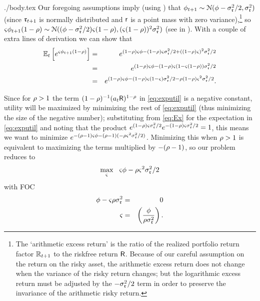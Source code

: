 \documentclass{bejournal}
\begin{document}
\begin{verbatimwrite}{./body.tex}
Our foregoing assumptions imply (using ) that $\phi_{t+1} \sim \mathcal{N}(\phi-\sigma_{\mathfrak{r}}^{2}/2,\sigma_{\mathfrak{r}}^{2})$ (since $\mathfrak{r}_{t+1}$ is normally distributed and $\mathsf{r}$ is a
point mass with zero variance),\footnote{The `arithmetic excess return' is the ratio of the realized portfolio return factor $\mathbb{R}_{t+1}$ to the riskfree return $\mathsf{R}$.  Because of our careful assumption on the return on the risky asset, the arithmetic excess return does not change when the variance of the risky return changes; but the logarithmic excess return must be adjusted by the $-\sigma^{2}_{\mathfrak{r}}/2$ term in order to preserve the invariance of the arithmetic risky return.} so ${\varsigma} \phi_{t+1}  (1-\rho) \sim \mathcal{N}((\phi - \sigma_{\mathfrak{r}}^{2}/2){\varsigma}  (1-\rho),({\varsigma}(1-\rho))^{2}\sigma_{\mathfrak{r}}^{2})$ (see  in \MathFacts).   With a couple of extra lines of derivation we can show that
\begin{eqnarray}
  \mathbb{E}_{t}\left[e^{{\varsigma} \phi_{t+1}  (1-\rho)}\right] & = & e^{(1-\rho){\varsigma} \phi-(1-\rho){\varsigma}\sigma_{\mathfrak{r}}^{2}/2+ ((1-\rho){\varsigma})^{2}\sigma_{\mathfrak{r}}^{2}/2} \notag
\\  & = & e^{(1-\rho){\varsigma} \phi-(1-\rho){\varsigma}(1-{\varsigma}(1-\rho))\sigma_{\mathfrak{r}}^{2}/2} \notag
\\  & = & e^{(1-\rho){\varsigma} \phi-(1-\rho){\varsigma}(1-{\varsigma})\sigma_{\mathfrak{r}}^{2}/2-\rho (1-\rho){\varsigma}^{2}\sigma_{\mathfrak{r}}^{2}/2}. \label{eq:Ex}
\end{eqnarray}

Since for $\rho > 1$ the term $(1-\rho)^{-1}(a_{t}\mathsf{R})^{1-\rho}$ in
\eqref{eq:exputil} is a negative constant, utility will be maximized
by minimizing the rest of \eqref{eq:exputil} (thus minimizing the size
of the negative number); substituting from \eqref{eq:Ex} for the
expectation in \eqref{eq:exputil} and noting that the product $e^{(1-\rho){\varsigma}\sigma_{\mathfrak{r}}^{2}/2}e^{-(1-\rho){\varsigma}\sigma_{\mathfrak{r}}^{2}/2}=1$, this means we want to minimize $e^{-(\rho-1){\varsigma} \phi  - (\rho-1)(- \rho  {\varsigma}^{2} \sigma_{\mathfrak{r}}^{2}/2)}$.  
Minimizing this when $\rho>1$ is equivalent to maximizing the terms
multiplied by $-(\rho-1)$, so our problem reduces to
\[
\max_{{\varsigma}}~~ {\varsigma} \phi -\rho{\varsigma}^{2}\sigma_{\mathfrak{r}}^{2}/2 
\]
with FOC
\begin{eqnarray}
         \phi-{\varsigma}\rho\sigma_{\mathfrak{r}}^{2}  & = & 0  \notag \\ 
{\varsigma} & = & \left(\frac{\phi}{\rho \sigma_{\mathfrak{r}}^{2}}\right)
. \label{eq:riskyshareMS}
\end{eqnarray}


\end{verbatimwrite}
\end{document}
